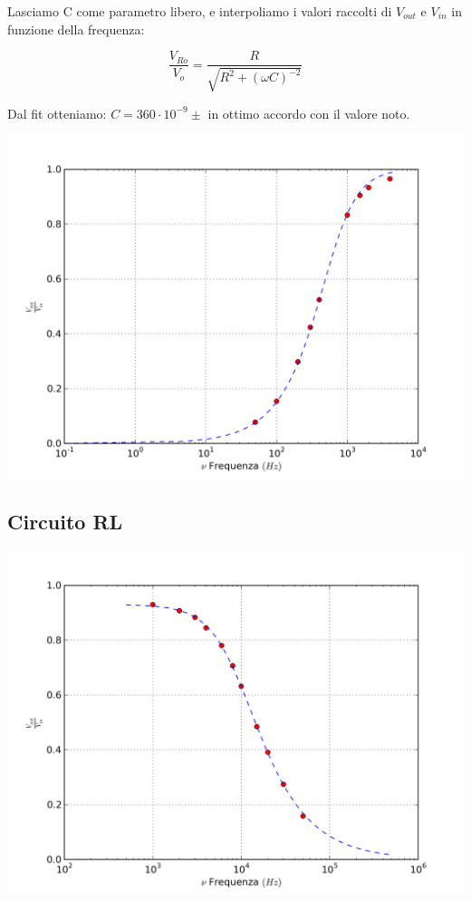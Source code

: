 Lasciamo C come parametro libero, e interpoliamo i valori raccolti di $V_{out}$ e $V_{in}$ in funzione della frequenza:

$$\frac{V_{Ro}}{V_o} = \frac{R}{\sqrt{R^2+(\omega C)^{-2}}}$$

Dal fit otteniamo: $C=360 \cdot 10^{-9} \pm  $ in ottimo accordo con il valore noto.

\begin{center}
 \includegraphics[scale=0.70]{grafici/C3/ddpcond.png}
\end{center}



\subsection{Circuito RL}

\begin{center}
 \includegraphics[scale=0.70]{grafici/C3/ddpindu.png}
\end{center}

